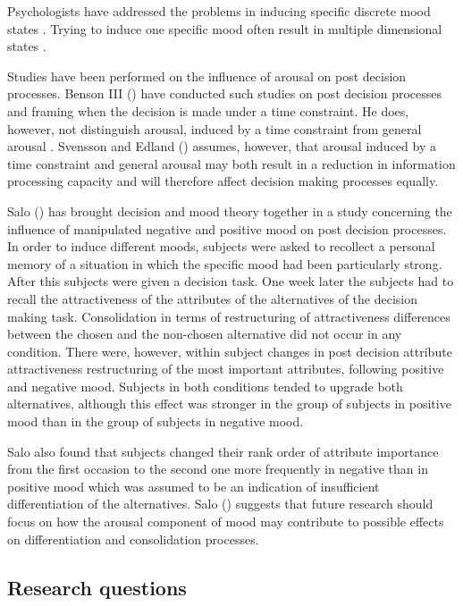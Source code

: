 \documentclass[jou,draftfirst,11pt]{apa6}
\begin{document}
Psychologists have addressed the problems in inducing specific
discrete mood states \parencite{Izard77, Polivy81}.  Trying to induce
one specific mood often result in multiple dimensional states
\parencite{Polivy81}.

Studies have been performed on the influence of arousal on post
decision processes.  Benson III (\citeyear{Benson93}) have conducted
such studies on 
post decision processes and framing when the decision is made under a
time constraint.  He does, however, not distinguish arousal, induced
by a time constraint from general arousal \parencite{Benson93,
  Svensson96}.  Svensson and Edland (\citeyear{SvenssonEdland87})
assumes, however, that arousal induced by a time constraint and
general arousal may both result in a reduction in information
processing capacity and will therefore affect decision making
processes equally.

Salo (\citeyear{Salo96}) has brought decision and mood theory together
in a study concerning the influence of manipulated negative and
positive mood on post decision processes.  In order to induce
different moods, subjects were asked to recollect a personal memory of
a situation in which the specific mood had been particularly strong.
After this subjects were given a decision task.  One week later the
subjects had to recall the attractiveness of the attributes of the
alternatives  of the decision making task.  Consolidation in terms of
restructuring of attractiveness differences between the chosen and the
non-chosen alternative did not occur in any condition.  There were,
however, within subject changes in post decision attribute
attractiveness restructuring of  the most important attributes,
following positive and negative mood.  Subjects in both conditions
tended to upgrade both alternatives, although this effect was stronger
in the group of subjects in positive mood than in the group of
subjects in negative mood.

Salo also found that subjects changed their rank order of attribute
importance from the first occasion to the second one more frequently
in negative than in positive mood which was assumed to be an
indication of insufficient differentiation of the alternatives.  Salo
(\citeyear{Salo96}) suggests that future research should focus on how
the arousal component of mood may contribute to possible effects on
differentiation and consolidation processes.


\subsection{Research questions}
\end{document}

